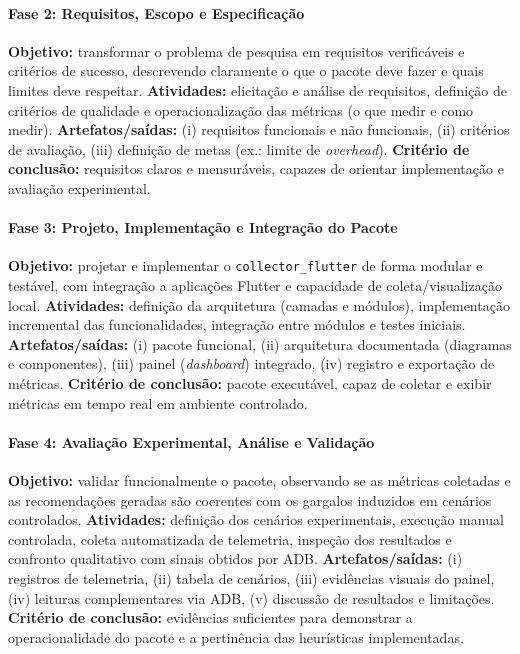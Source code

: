 \paragraph{Fase 2: Requisitos, Escopo e Especificação}
\textbf{Objetivo:} transformar o problema de pesquisa em requisitos verificáveis e critérios de sucesso, descrevendo claramente o que o pacote deve fazer e quais limites deve respeitar.
\textbf{Atividades:} elicitação e análise de requisitos, definição de critérios de qualidade e operacionalização das métricas (o que medir e como medir).
\textbf{Artefatos/saídas:} (i) requisitos funcionais e não funcionais, (ii) critérios de avaliação, (iii) definição de metas (ex.: limite de \textit{overhead}).
\textbf{Critério de conclusão:} requisitos claros e mensuráveis, capazes de orientar implementação e avaliação experimental.

\paragraph{Fase 3: Projeto, Implementação e Integração do Pacote}
\textbf{Objetivo:} projetar e implementar o \texttt{collector\_flutter} de forma modular e testável, com integração a aplicações Flutter e capacidade de coleta/visualização local.
\textbf{Atividades:} definição da arquitetura (camadas e módulos), implementação incremental das funcionalidades, integração entre módulos e testes iniciais.
\textbf{Artefatos/saídas:} (i) pacote funcional, (ii) arquitetura documentada (diagramas e componentes), (iii) painel (\textit{dashboard}) integrado, (iv) registro e exportação de métricas.
\textbf{Critério de conclusão:} pacote executável, capaz de coletar e exibir métricas em tempo real em ambiente controlado.

\paragraph{Fase 4: Avaliação Experimental, Análise e Validação}
\textbf{Objetivo:} validar funcionalmente o pacote, observando se as métricas coletadas e as recomendações geradas são coerentes com os gargalos induzidos em cenários controlados.
\textbf{Atividades:} definição dos cenários experimentais, execução manual controlada, coleta automatizada de telemetria, inspeção dos resultados e confronto qualitativo com sinais obtidos por ADB.
\textbf{Artefatos/saídas:} (i) registros de telemetria, (ii) tabela de cenários, (iii) evidências visuais do painel, (iv) leituras complementares via ADB, (v) discussão de resultados e limitações.
\textbf{Critério de conclusão:} evidências suficientes para demonstrar a operacionalidade do pacote e a pertinência das heurísticas implementadas.

